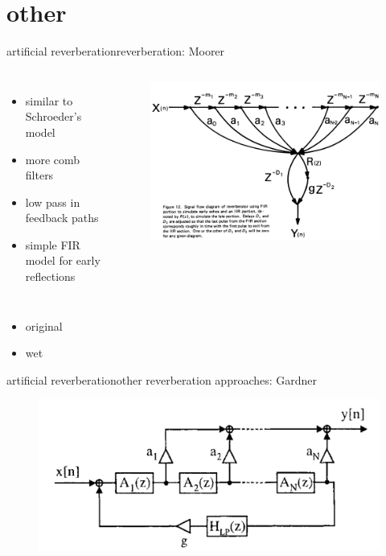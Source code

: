 \section{other}
\begin{frame}{artificial reverberation}{reverberation: Moorer}
    \begin{columns}
	\begin{itemize}
		\item	similar to Schroeder's model
		\item	more comb filters
		\item	low pass in feedback paths
		\item	simple FIR model for early reflections
	\end{itemize}
        \begin{figure}
            \includegraphics[scale=.3]{graph/moorer}
        \end{figure}
    \end{columns}
    \begin{itemize}
        \item   original 
        \item   wet 
    \end{itemize}
\end{frame}

\begin{frame}{artificial reverberation}{other reverberation approaches: Gardner}
	\begin{figure}
		\centerline{\includegraphics[scale=.4]{graph/gardnerreverb}}
	\end{figure} 
\end{frame}

